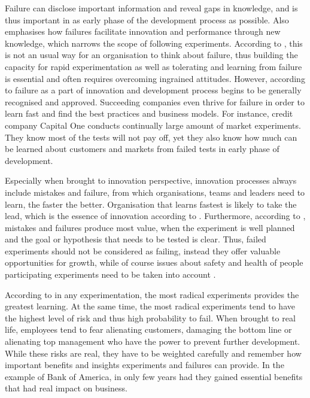 Failure can disclose important information and reveal gaps in knowledge, and is thus important in as early phase of the development process as possible. \citep{buijs2007innovation,thomke2001enlightened} Also \citet{sitkin1992learning} emphasises how failures facilitate innovation and performance through new knowledge, which narrows the scope of following experiments. According to \citet{thomke2001enlightened}, this is not an usual way for an organisation to think about failure, thus building the capacity for rapid experimentation as well as tolerating and learning from failure is essential and often requires overcoming ingrained attitudes. However, according to \citet{farson2002failuretolerantleader} failure as a part of innovation and development process begins to be generally recognised and approved. Succeeding companies even thrive for failure in order to learn fast and find the best practices and business models. For instance, credit company Capital One conducts continually large amount of market experiments. They know most of the tests will not pay off, yet they also know how much can be learned about customers and markets from failed tests in early phase of development. \citep{farson2002failuretolerantleader}

Especially when brought to innovation perspective, innovation processes always include mistakes and failure, from which organisations, teams and leaders need to learn, the faster the better. Organisation that learns fastest is likely to take the lead, which is the essence of innovation according to \citet{buijs2007innovation}. Furthermore, according to \citet{thomke2001enlightened}, mistakes and failures produce most value, when the experiment is well planned and the goal or hypothesis that needs to be tested is clear. Thus, failed experiments should not be considered as failing, instead they offer valuable opportunities for growth, while of course issues about safety and health of people participating experiments need to be taken into account \citep{farson2002failuretolerantleader}. 

According to \citet{thomke2003r} in any experimentation, the most radical experiments provides the greatest learning. At the same time, the most radical experiments tend to have the highest level of risk and thus high probability to fail. When brought to real life, employees tend to fear alienating customers, damaging the bottom line or alienating top management who have the power to prevent further development. While these risks are real, they have to be weighted carefully and remember how important benefits and insights experiments and failures can provide. In the example of Bank of America, in only few years had they gained essential benefits that had real impact on business. \citep{thomke2003r}

